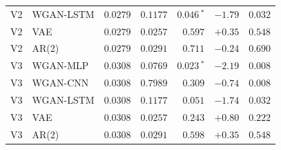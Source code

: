 \begin{table}[!htbp]
\begin{tabular}{@{}llrrrrr@{}}
V2 & WGAN-LSTM & $0.0279$ & $0.1177$ & $0.046\,^{*}$ & $-1.79$ & $0.032$ \\
V2 & VAE & $0.0279$ & $0.0257$ & $0.597$ & $+0.35$ & $0.548$ \\
V2 & AR(2) & $0.0279$ & $0.0291$ & $0.711$ & $-0.24$ & $0.690$ \\
V3 & WGAN-MLP & $0.0308$ & $0.0769$ & $0.023\,^{*}$ & $-2.19$ & $0.008$ \\
V3 & WGAN-CNN & $0.0308$ & $0.7989$ & $0.309$ & $-0.74$ & $0.008$ \\
V3 & WGAN-LSTM & $0.0308$ & $0.1177$ & $0.051$ & $-1.74$ & $0.032$ \\
V3 & VAE & $0.0308$ & $0.0257$ & $0.243$ & $+0.80$ & $0.222$ \\
V3 & AR(2) & $0.0308$ & $0.0291$ & $0.598$ & $+0.35$ & $0.548$ \\
\bottomrule
\end{tabular}
\end{table}

